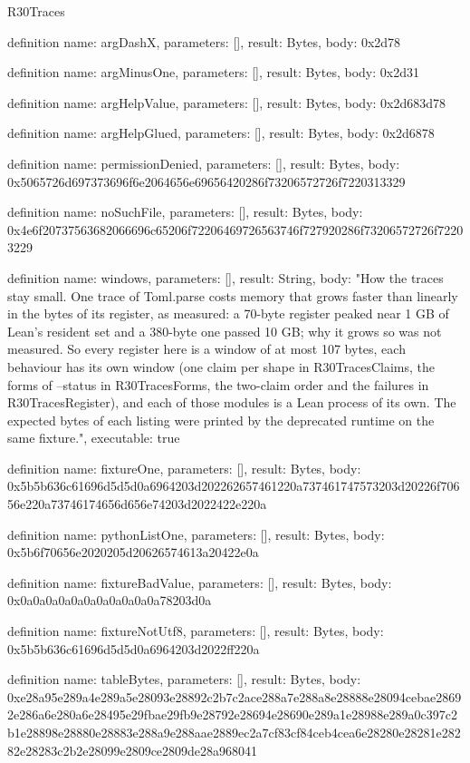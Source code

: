 \begin{lexlean}{R30Traces}
\begin{semanticmodule}
definition{
  name: argDashX,
  parameters: [],
  result: Bytes,
  body: 0x2d78
}

definition{
  name: argMinusOne,
  parameters: [],
  result: Bytes,
  body: 0x2d31
}

definition{
  name: argHelpValue,
  parameters: [],
  result: Bytes,
  body: 0x2d683d78
}

definition{
  name: argHelpGlued,
  parameters: [],
  result: Bytes,
  body: 0x2d6878
}

definition{
  name: permissionDenied,
  parameters: [],
  result: Bytes,
  body: 0x5065726d697373696f6e2064656e69656420286f73206572726f7220313329
}

definition{
  name: noSuchFile,
  parameters: [],
  result: Bytes,
  body: 0x4e6f20737563682066696c65206f72206469726563746f727920286f73206572726f72203229
}

definition{
  name: windows,
  parameters: [],
  result: String,
  body: "How the traces stay small. One trace of Toml.parse costs memory that grows faster than linearly in the bytes of its register, as measured: a 70-byte register peaked near 1 GB of Lean's resident set and a 380-byte one passed 10 GB; why it grows so was not measured. So every register here is a window of at most 107 bytes, each behaviour has its own window (one claim per shape in R30TracesClaims, the forms of --status in R30TracesForms, the two-claim order and the failures in R30TracesRegister), and each of those modules is a Lean process of its own. The expected bytes of each listing were printed by the deprecated runtime on the same fixture.",
  executable: true
}

definition{
  name: fixtureOne,
  parameters: [],
  result: Bytes,
  body: 0x5b5b636c61696d5d5d0a6964203d202262657461220a737461747573203d20226f70656e220a73746174656d656e74203d2022422e220a
}

definition{
  name: pythonListOne,
  parameters: [],
  result: Bytes,
  body: 0x5b6f70656e2020205d20626574613a20422e0a
}

definition{
  name: fixtureBadValue,
  parameters: [],
  result: Bytes,
  body: 0x0a0a0a0a0a0a0a0a0a0a0a78203d0a
}

definition{
  name: fixtureNotUtf8,
  parameters: [],
  result: Bytes,
  body: 0x5b5b636c61696d5d5d0a6964203d2022ff220a
}

definition{
  name: tableBytes,
  parameters: [],
  result: Bytes,
  body: 0xe28a95e289a4e289a5e28093e28892c2b7c2ace288a7e288a8e28888e28094cebae28692e286a6e280a6e28495e29fbae29fb9e28792e28694e28690e289a1e28988e289a0c397c2b1e28898e28880e28883e288a9e288aae2889ec2a7cf83cf84ceb4cea6e28280e28281e28282e28283c2b2e28099e2809ce2809de28a968041
}


\end{semanticmodule}
\end{lexlean}
